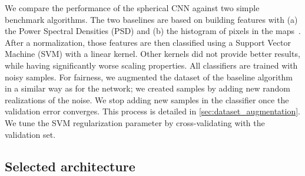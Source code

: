 \documentclass[final,twocolumn,3p,times,authoryear]{elsarticle}
\newcommand{\1}{\b{1}}              %
\newcommand{\0}{\b{0}}              %
\begin{document}
We compare the performance of the spherical CNN against two simple benchmark algorithms.
The two baselines are based on building features with
(a) the Power Spectral Densities (PSD) and
(b) the histogram of pixels in the maps~\cite{patton2017cosmologicalconstraints}.
After a normalization, those features are then classified using a Support Vector Machine (SVM) with a linear kernel.
Other kernels did not provide better results, while having significantly worse scaling properties.
All classifiers are trained with noisy samples.
For fairness, we augmented the dataset of the baseline algorithm in a similar way as for the network; we created samples by adding new random realizations of the noise.
We stop adding new samples in the classifier once the validation error converges.
This process is detailed in \ref{sec:dataset_augmentation}.
We tune the SVM regularization parameter by cross-validating with the validation set.

\subsection{Selected architecture}
\label{sec:selected_architecture}
\end{document}
